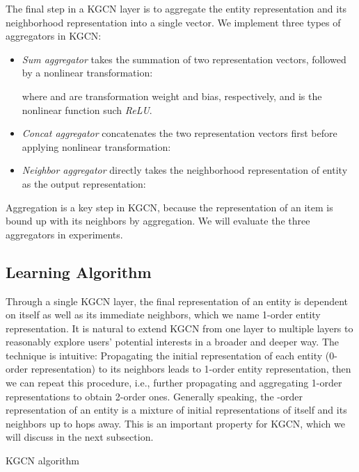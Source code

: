 \documentclass[sigconf]{acmart}
\begin{document}
		The final step in a KGCN layer is to aggregate the entity representation  and its neighborhood representation  into a single vector.
		We implement three types of aggregators  in KGCN:
		\begin{itemize}
			\item
				\textit{Sum aggregator} takes the summation of two representation vectors, followed by a nonlinear transformation:
				
				where  and  are transformation weight and bias, respectively, and  is the nonlinear function such \textit{ReLU}.
			\item
				\textit{Concat aggregator} \cite{hamilton2017inductive} concatenates the two representation vectors first before applying nonlinear transformation:
				
			\item
				\textit{Neighbor aggregator} \cite{velickovic2017graph} directly takes the neighborhood representation of entity  as the output representation:
				
		\end{itemize}
		Aggregation is a key step in KGCN, because the representation of an item is bound up with its neighbors by aggregation.
		We will evaluate the three aggregators in experiments.
		
		
	\subsection{Learning Algorithm}
		Through a single KGCN layer, the final representation of an entity is dependent on itself as well as its immediate neighbors, which we name 1-order entity representation.
		It is natural to extend KGCN from one layer to multiple layers to reasonably explore users' potential interests in a broader and deeper way.
		The technique is intuitive:
		Propagating the initial representation of each entity (0-order representation) to its neighbors leads to 1-order entity representation, then we can repeat this procedure, i.e., further propagating and aggregating 1-order representations to obtain 2-order ones.
		Generally speaking, the -order representation of an entity is a mixture of initial representations of itself and its neighbors up to  hops away.
		This is an important property for KGCN, which we will discuss in the next subsection.
		
		\begin{algorithm}[t]
			\caption{KGCN algorithm}
			\label{alg:kgcn}
			\Return \;
			\BlankLine
{}
		\end{algorithm}
		
\end{document}
